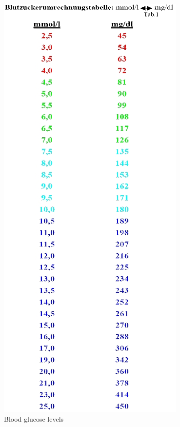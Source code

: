 \begin{figure}[htb]
\centering
\includegraphics[width=\textwidth]{images/Conversion.jpg}
\caption{Blood glucose levels}
\end{figure}
